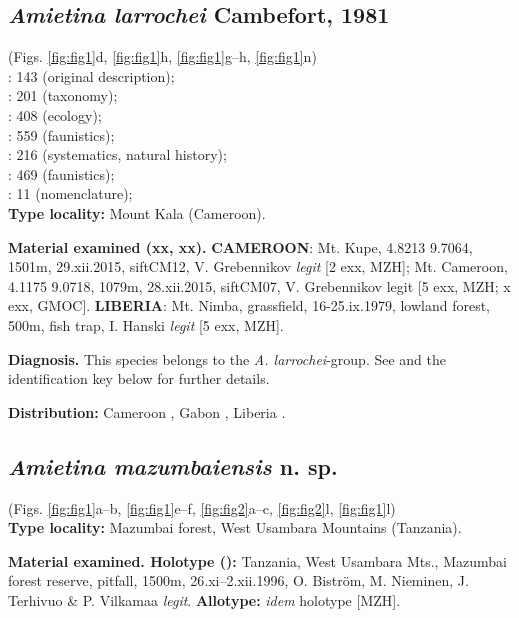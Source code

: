 \documentclass[fleqn,10pt,lineno]{wlpeerj}
\begin{document}
\subsection*{\textbf{\textit{Amietina larrochei} Cambefort, 1981}}
(Figs. \ref{fig:fig1}d, \ref{fig:fig1}h, \ref{fig:fig1}g--h, \ref{fig:fig1}n) \\
\cite{cambefort1981amietina}: 143 (original description);\\
\cite{branco1988deux}: 201 (taxonomy);\\
\cite{cambefort1991dung}: 408 (ecology);\\
\cite{cambefort2003nimba}: 559 (faunistics);\\
\cite{davis2008african}: 216 (systematics, natural history);\\
\cite{moretto2010bayanga}: 469 (faunistics);\\
\cite{branco2014scarabaeidae}: 11 (nomenclature);\\

\textbf{Type locality:} Mount Kala (Cameroon).

\textbf{Material examined (xx\male\male, xx\female\female).} \textbf{CAMEROON}: Mt. Kupe, 4.8213 9.7064, 1501m, 29.xii.2015, siftCM12, V. Grebennikov \textit{legit} [2 exx, MZH]; Mt. Cameroon, 4.1175 9.0718, 1079m, 28.xii.2015, siftCM07, V. Grebennikov legit [5 exx, MZH; x exx, GMOC]. \textbf{LIBERIA}: Mt. Nimba, grassfield, 16-25.ix.1979, lowland forest, 500m, fish trap, I. Hanski \textit{legit} [5 exx, MZH].

\textbf{Diagnosis.} This species belongs to the \textit{A. larrochei}-group. See \citep{branco1988deux} and the identification key below for further details.

\textbf{Distribution:} Cameroon \citep{cambefort1981amietina}, Gabon \citep{cambefort1991dung}, Liberia \citep{branco1988deux}.

\subsection*{\textbf{\textit{Amietina mazumbaiensis} n. sp.}}
(Figs. \ref{fig:fig1}a--b, \ref{fig:fig1}e--f, \ref{fig:fig2}a--c, \ref{fig:fig2}l, \ref{fig:fig1}l) \\

\textbf{Type locality:} Mazumbai forest, West Usambara Mountains (Tanzania).

\textbf{Material examined. Holotype (\male):} Tanzania, West Usambara Mts., Mazumbai forest reserve, pitfall, 1500m, 26.xi–2.xii.1996, O. Biström, M. Nieminen, J. Terhivuo \& P. Vilkamaa \textit{legit}. \textbf{Allotype:} \textit{idem} holotype [MZH].
\end{document}
